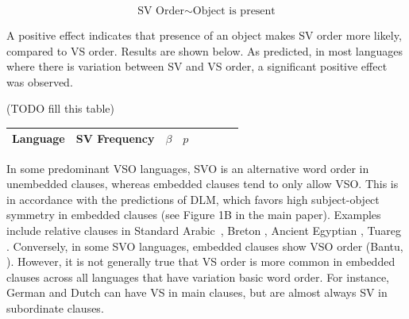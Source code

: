 \documentclass[11pt,a4paper]{article}
\newcommand\mhahn[1]{{\color{red}(#1)}}
\begin{document}
\begin{equation}
\text{SV Order} \sim \text{Object is present}
\end{equation}

A positive effect indicates that presence of an object makes SV order more likely, compared to VS order.
Results are shown below.
As predicted, in most languages where there is variation between SV and VS order, a significant positive effect was observed.

\mhahn{TODO fill this table}
\begin{longtable}{l|lllllll}
Language & SV Frequency & $\beta$ & $p$ \\ \hline
%
\end{longtable}




In some predominant VSO languages, SVO is an alternative word order in unembedded clauses, whereas embedded clauses tend to only allow VSO.
This is in accordance with the predictions of DLM, which favors high subject-object symmetry in embedded clauses (see Figure 1B in the main paper).
Examples include relative clauses in Standard Arabic~\citep{alqurashi:2012}, Breton \citep[][p. 80]{timm1988relative}, Ancient Egyptian \citep{gardiner1957egyptian}, Tuareg \citep[Chapter 12.1.2]{heath2005a}.
Conversely, in some SVO languages, embedded clauses show VSO order (Bantu, \citet{demuth1999verb}).
However, it is not generally true that VS order is more common in embedded clauses across all languages that have variation basic word order. For instance, German and Dutch can have VS in main clauses, but are almost always SV in subordinate clauses.





\end{document}
